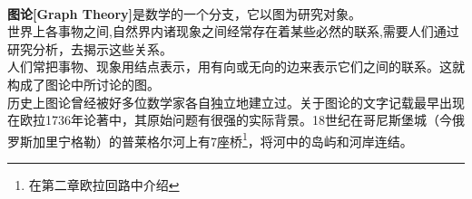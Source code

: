 \documentclass[11pt,a4paper,openany]{book}
\begin{document}
\paragraph{}\textbf{图论[Graph Theory]}是数学的一个分支，它以图为研究对象。\\
\indent 世界上各事物之间,自然界内诸现象之间经常存在着某些必然的联系,需要人们通过研究分析，去揭示这些关系。\\
\indent 人们常把事物、现象用\textcolor[rgb]{1.00,0.00,0.00}{结点}表示，用有向或无向的\textcolor[rgb]{1.00,0.00,0.00}{边}来表示它们之间的联系。这就构成了图论中所讨论的\textcolor[rgb]{1.00,0.00,0.00}{图}。\\
\indent 历史上图论曾经被好多位数学家各自独立地建立过。关于图论的文字记载最早出现在欧拉1736年论著中，其原始问题有很强的实际背景。18世纪在哥尼斯堡城（今俄罗斯加里宁格勒）的普莱格尔河上有7座桥\footnote{在第二章欧拉回路中介绍}，将河中的岛屿和河岸连结。\\
\end{document}
